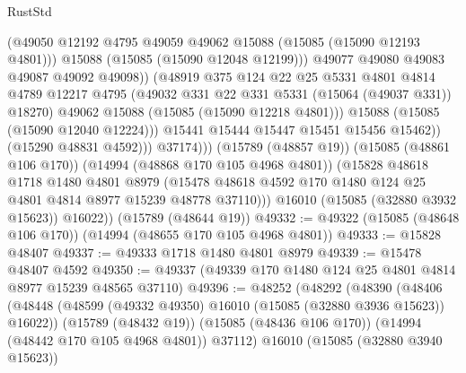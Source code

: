 \begin{lexlean}{RustStd}
\begin{coremodule}
                                (@49050
                                  @12192
                                  @4795
                                  @49059
                                  @49062
                                  @15088
                                  (@15085 (@15090 @12193 @4801)))
                                @15088
                                (@15085 (@15090 @12048 @12199)))
                              @49077
                              @49080
                              @49083
                              @49087
                              @49092
                              @49098))
                          (@48919
                            @375
                            @124
                            @22
                            @25
                            @5331
                            @4801
                            @4814
                            @4789
                            @12217
                            @4795
                            (@49032 @331 @22 @331 @5331 (@15064 (@49037 @331)) @18270)
                            @49062
                            @15088
                            (@15085 (@15090 @12218 @4801)))
                          @15088
                          (@15085 (@15090 @12040 @12224)))
                        @15441
                        @15444
                        @15447
                        @15451
                        @15456
                        @15462))
                    (@15290 @48831 @4592)))
                @37174)))
          (@15789 (@48857 @19))
          (@15085 (@48861 @106 @170))
          (@14994 (@48868 @170 @105 @4968 @4801))
          (@15828
            @48618
            @1718
            @1480
            @4801
            @8979
            (@15478 @48618 @4592 @170 @1480 @124 @25 @4801 @4814 @8977 @15239 @48778 @37110)))
        @16010
        (@15085 (@32880 @3932 @15623))
        @16022))
    (@15789 (@48644 @19))
@49332 := @49322 (@15085 (@48648 @106 @170)) (@14994 (@48655 @170 @105 @4968 @4801))
@49333 := @15828 @48407
@49337 := @49333 @1718 @1480 @4801 @8979
@49339 := @15478 @48407 @4592
@49350 := @49337 (@49339 @170 @1480 @124 @25 @4801 @4814 @8977 @15239 @48565 @37110)
@49396 := @48252
    (@48292
      (@48390
        (@48406
          (@48448 (@48599 (@49332 @49350) @16010 (@15085 (@32880 @3936 @15623)) @16022))
          (@15789 (@48432 @19))
          (@15085 (@48436 @106 @170))
          (@14994 (@48442 @170 @105 @4968 @4801))
          @37112)
        @16010
        (@15085 (@32880 @3940 @15623))

\end{coremodule}
\end{lexlean}
